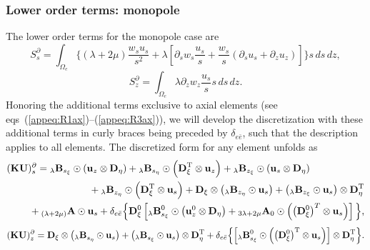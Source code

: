 \documentclass[11pt,letter,fleqn,english,notitlepage]{article}
\newcommand{\eq}{\begin{equation}} \newcommand{\en}{\end{equation}}
\newcommand{\eqa}{\begin{eqnarray}} \newcommand{\ena}{\end{eqnarray}}
\newcommand{\bu}{\mbox{${\bf u}$}} \newcommand{\bv}{\mbox{${\bf v}$}}
\newcommand{\bD}{\mbox{${\bf D}$}} \newcommand{\bU}{\mbox{${\bf U}$}}
\newcommand{\bK}{\mbox{${\bf K}$}} \newcommand{\bS}{\mbox{${\bf S}$}}
\newcommand{\bA}{\mbox{${\bf A}$}} \newcommand{\bQ}{\mbox{${\bf Q}$}}
\begin{document}
\subsubsection{Lower order terms: monopole}
%
The lower order terms for the monopole case are
%
\eq
S_s^{\partial}=\int_{\Omega_e}\Big\{\left(\lambda+2\mu\right)
\frac{w_s{u_s}}{s^2} +\lambda\left[\partial_s{w_s}\frac{u_s}{s}
+\frac{w_s}{s}\left(\partial_s{u_s}+\partial_z{u_z}\right)\right]\Big\}
s\,ds\,dz,
\en
%
\eq
S_z^{\partial}=\int_{\Omega_e}\lambda\partial_z{w_z}\frac{u_s}{s}s\,ds\,dz.
\en
%
Honoring the additional terms exclusive to axial elements 
(see eqs~(\ref{appeq:R1ax})--(\ref{appeq:R3ax})), we will develop the 
discretization with these additional terms in curly braces being 
preceded by $\delta_{e\bar{e}}$, such that the description applies to 
all elements. The discretized form for any element unfolds as
%
\eqa \label{appeq:loword_monos}
\lefteqn{
(\bK\bU)_s^{\partial}=
{}_\lambda{\bB}_{s_\xi} \odot \left(\bu_z\otimes\bD_{\eta}\right)+
{}_\lambda{\bB}_{s_\eta} \odot \left(\bD_\xi^{\rm{T}}\otimes{\bu_z}\right)+
{}_\lambda{\bB}_{z_\xi} \odot 
\left(\bu_s{}\otimes\bD_{\eta}\right) }\nonumber\\
&&\mbox{}\hspace{1.3em} 
+{_\lambda\bB}_{z_\eta} \odot 
\left(\bD_\xi^{\rm{T}}\otimes{\bu_s}\right)+
\bD_{\xi}\otimes\left({}_\lambda{\bB}_{z_\eta} \odot {\bu_s}\right)
+\left({}_\lambda{\bB}_{z_\xi} \odot {\bu_s}\right)\otimes\bD_{\eta}^{\rm{T}}
\nonumber\\
&&\mbox{}\hspace{1.3em}
+{}_{(\lambda+2\mu)}{\bA}\odot\bu_s +
\delta_{e\bar{e}}\Big\{\bD^0_{\xi}
\left[{}_\lambda{\bB}^0_{s_\xi} \odot \left(\bu_z^0\otimes\bD_{\eta}\right)+
{}_{3\lambda+2\mu}{\bA_0} \odot 
\left(\left(\bD^0_{\xi}\right)^{T}\otimes\bu_s\right)
\right]\Big\},
\ena
%
\eq \label{appeq:loword_monoz}
(\bK\bU)_z^{\partial}=\bD_{\xi}\otimes
\left({{}_\lambda\bB}_{s_\eta} \odot {\bu_s}\right)+
\left({{}_\lambda\bB}_{s_\xi} \odot 
{\bu_s}\right)\otimes{\bD_{\eta}^{\rm{T}}}+
\delta_{e\bar{e}}\Big\{\Bigl[{}_\lambda\bB^0_{s_\xi} \odot 
\left(\left(\bD^0_\xi\right)^{\rm{T}}
\otimes\bu_s\right)\Bigr]\otimes\bD_{\eta}^{\rm{T}}\Big\}.
\en
%
%
\end{document}
